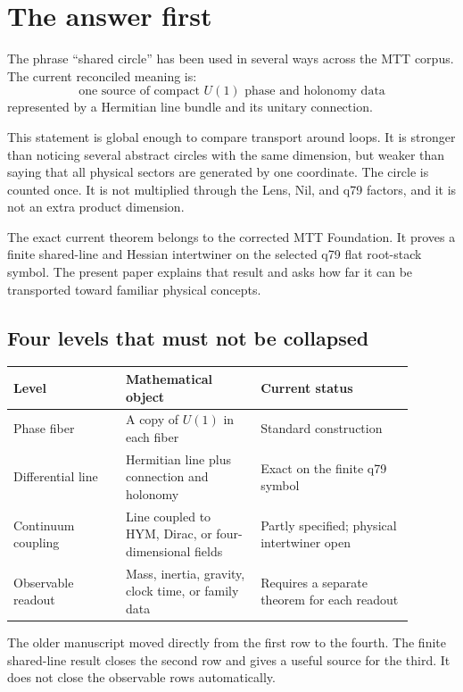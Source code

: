 \documentclass[11pt]{article}
\begin{document}
\tableofcontents

\section{The answer first}

The phrase ``shared circle'' has been used in several ways across the MTT
corpus. The current reconciled meaning is:
\[
\boxed{\text{one source of compact \(U(1)\) phase and holonomy data}}
\]
represented by a Hermitian line bundle and its unitary connection.

This statement is global enough to compare transport around loops. It is
stronger than noticing several abstract circles with the same dimension, but
weaker than saying that all physical sectors are generated by one coordinate.
The circle is counted once. It is not multiplied through the Lens, Nil, and
q79 factors, and it is not an extra product dimension.

The exact current theorem belongs to the corrected MTT Foundation. It proves a
finite shared-line and Hessian intertwiner on the selected q79 flat
root-stack symbol. The present paper explains that result and asks how far it
can be transported toward familiar physical concepts.

\subsection{Four levels that must not be collapsed}

\begin{center}
\begin{tabular}{p{0.25\linewidth}p{0.30\linewidth}p{0.34\linewidth}}
\hline
Level & Mathematical object & Current status\\
\hline
Phase fiber & A copy of \(U(1)\) in each fiber & Standard construction\\
Differential line & Hermitian line plus connection and holonomy & Exact on
the finite q79 symbol\\
Continuum coupling & Line coupled to HYM, Dirac, or four-dimensional fields &
Partly specified; physical intertwiner open\\
Observable readout & Mass, inertia, gravity, clock time, or family data &
Requires a separate theorem for each readout\\
\hline
\end{tabular}
\end{center}

The older manuscript moved directly from the first row to the fourth. The
finite shared-line result closes the second row and gives a useful source for
the third. It does not close the observable rows automatically.
\end{document}
